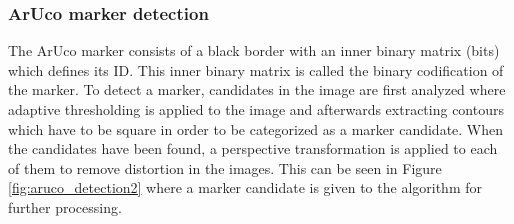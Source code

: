 \documentclass[../Head/report.tex]{subfiles}
\begin{document}
\subsubsection{ArUco marker detection}

The ArUco marker consists of a black border with an inner binary matrix (bits) which defines its ID. This inner binary matrix is called the binary codification of the marker. To detect a marker, candidates in the image are first analyzed where adaptive thresholding is applied to the image and afterwards extracting contours which have to be square in order to be categorized as a marker candidate. When the candidates have been found, a perspective transformation is applied to each of them to remove distortion in the images. This can be seen in Figure \ref{fig:aruco_detection2} where a marker candidate is given to the algorithm for further processing.
\end{document}
